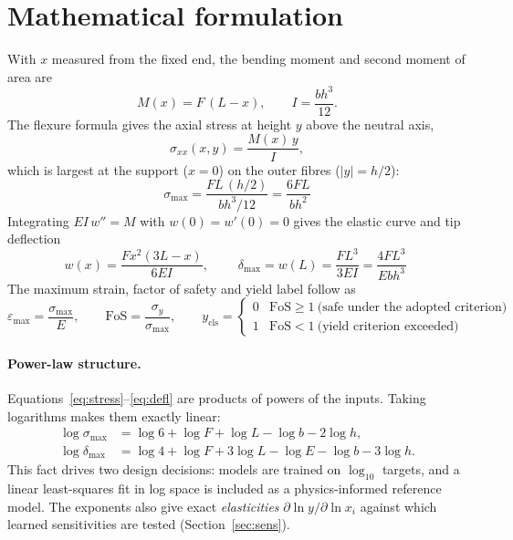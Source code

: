 \documentclass[11pt,a4paper]{article}
\newcommand{\smax}{\sigma_{\max}}
\newcommand{\dmax}{\delta_{\max}}
\begin{document}
\section{Mathematical formulation}
With $x$ measured from the fixed end, the bending moment and second moment of area are
\begin{equation}
M(x)=F\,(L-x),\qquad I=\frac{b h^{3}}{12}.
\end{equation}
The flexure formula gives the axial stress at height $y$ above the neutral axis,
\begin{equation}
\sigma_{xx}(x,y)=\frac{M(x)\,y}{I},
\end{equation}
which is largest at the support ($x=0$) on the outer fibres ($|y|=h/2$):
\begin{equation}
\boxed{\;\smax=\frac{F L\,(h/2)}{b h^{3}/12}=\frac{6FL}{bh^{2}}\;}
\label{eq:stress}
\end{equation}
Integrating $EI\,w''=M$ with $w(0)=w'(0)=0$ gives the elastic curve and tip deflection
\begin{equation}
w(x)=\frac{F x^{2}(3L-x)}{6EI},\qquad
\boxed{\;\dmax=w(L)=\frac{FL^{3}}{3EI}=\frac{4FL^{3}}{Ebh^{3}}\;}
\label{eq:defl}
\end{equation}
The maximum strain, factor of safety and yield label follow as
\begin{equation}
\varepsilon_{\max}=\frac{\smax}{E},\qquad \mathrm{FoS}=\frac{\sigma_y}{\smax},\qquad
y_{\mathrm{cls}}=\begin{cases}0 & \mathrm{FoS}\ge 1\ \text{(safe under the adopted criterion)}\\ 1 & \mathrm{FoS}<1\ \text{(yield criterion exceeded)}\end{cases}
\end{equation}

\paragraph{Power-law structure.} Equations~\eqref{eq:stress}--\eqref{eq:defl} are products of powers of the inputs.
Taking logarithms makes them exactly linear:
\begin{align}
\log\smax &= \log 6 + \log F + \log L - \log b - 2\log h,\\
\log\dmax &= \log 4 + \log F + 3\log L - \log E - \log b - 3\log h.
\end{align}
This fact drives two design decisions: models are trained on $\log_{10}$ targets, and a linear least-squares fit in log
space is included as a physics-informed reference model. The exponents also give exact \emph{elasticities}
$\partial\ln y/\partial\ln x_i$ against which learned sensitivities are tested (Section~\ref{sec:sens}).
\end{document}
